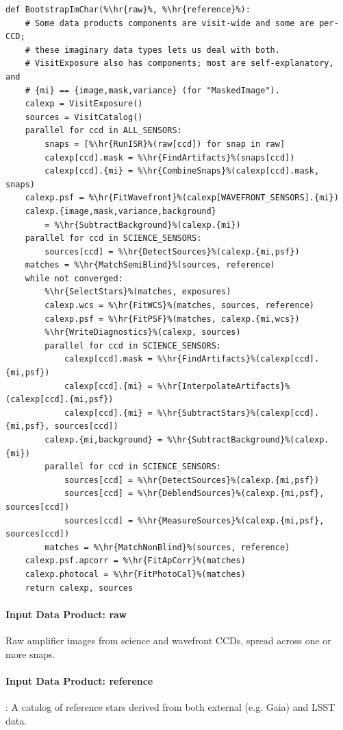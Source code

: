 \begin{lstlisting}
def BootstrapImChar(%\hr{raw}%, %\hr{reference}%):
    # Some data products components are visit-wide and some are per-CCD;
    # these imaginary data types lets us deal with both.
    # VisitExposure also has components; most are self-explanatory, and
    # {mi} == {image,mask,variance} (for "MaskedImage").
    calexp = VisitExposure()
    sources = VisitCatalog()
    parallel for ccd in ALL_SENSORS:
        snaps = [%\hr{RunISR}%(raw[ccd]) for snap in raw]
        calexp[ccd].mask = %\hr{FindArtifacts}%(snaps[ccd])
        calexp[ccd].{mi} = %\hr{CombineSnaps}%(calexp[ccd].mask, snaps)
    calexp.psf = %\hr{FitWavefront}%(calexp[WAVEFRONT_SENSORS].{mi})
    calexp.{image,mask,variance,background}
        = %\hr{SubtractBackground}%(calexp.{mi})
    parallel for ccd in SCIENCE_SENSORS:
        sources[ccd] = %\hr{DetectSources}%(calexp.{mi,psf})
    matches = %\hr{MatchSemiBlind}%(sources, reference)
    while not converged:
        %\hr{SelectStars}%(matches, exposures)
        calexp.wcs = %\hr{FitWCS}%(matches, sources, reference)
        calexp.psf = %\hr{FitPSF}%(matches, calexp.{mi,wcs})
        %\hr{WriteDiagnostics}%(calexp, sources)
        parallel for ccd in SCIENCE_SENSORS:
            calexp[ccd].mask = %\hr{FindArtifacts}%(calexp[ccd].{mi,psf})
            calexp[ccd].{mi} = %\hr{InterpolateArtifacts}%(calexp[ccd].{mi,psf})
            calexp[ccd].{mi} = %\hr{SubtractStars}%(calexp[ccd].{mi,psf}, sources[ccd])
        calexp.{mi,background} = %\hr{SubtractBackground}%(calexp.{mi})
        parallel for ccd in SCIENCE_SENSORS:
            sources[ccd] = %\hr{DetectSources}%(calexp.{mi,psf})
            sources[ccd] = %\hr{DeblendSources}%(calexp.{mi,psf}, sources[ccd])
            sources[ccd] = %\hr{MeasureSources}%(calexp.{mi,psf}, sources[ccd])
        matches = %\hr{MatchNonBlind}%(sources, reference)
    calexp.psf.apcorr = %\hr{FitApCorr}%(matches)
    calexp.photocal = %\hr{FitPhotoCal}%(matches)
    return calexp, sources
\end{lstlisting}

\paragraph{Input Data Product: raw}
\label{sec:drpBootstrapImChar_raw}
Raw amplifier images from science and wavefront CCDs, spread across one or more snaps.

\paragraph{Input Data Product: reference}:
\label{sec:drpBootstrapImChar_reference}
 A catalog of reference stars derived from both external (e.g. Gaia) and LSST data.

